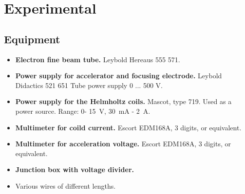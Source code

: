 \documentclass[../Elmag-labhefte-2020.tex]{subfiles}
\begin{document}

\section{Experimental \label{ch.lorentz.eksp}}

\subsection{Equipment}

\begin{itemize}
    \item \textbf{Electron fine beam tube.} Leybold Hereaus 555 571.
    \item \textbf{Power supply for accelerator and focusing electrode.} Leybold Didactics 521 651 Tube power supply 0 ... 500 V.
    
    \item \textbf{Power supply for the Helmholtz coils.} Mascot, type 719. Used as a power source.
    Range: 0- \SI{15}{\volt}, \SI{30}{\milli\ampere} - \SI{2}{\ampere}.
    \item \textbf{Multimeter for coild current.} Escort EDM168A, 3 digits, or equivalent.
    \item \textbf{Multimeter for acceleration voltage.} Escort EDM168A, 3 digits, or equivalent.
   
    \item \textbf{Junction box with voltage divider.}
    \item Various wires of different lengths.
\end{itemize}
\end{document}
